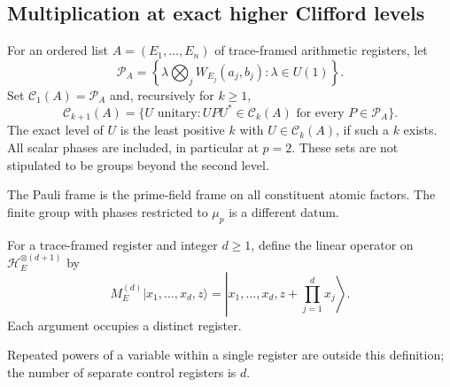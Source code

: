 \subsection{Multiplication at exact higher Clifford levels}

\begin{definition}
For an ordered list $A=(E_1,\ldots,E_n)$ of trace-framed arithmetic
registers, let
\[
 \mathcal P_A=
 \left\{\lambda\bigotimes_jW_{E_j}(a_j,b_j):\lambda\in U(1)\right\}.
\]
Set $\mathcal C_1(A)=\mathcal P_A$ and, recursively for $k\geq1$,
\[
 \mathcal C_{k+1}(A)=
 \{U\text{ unitary}:UPU^*\in\mathcal C_k(A)
                         \text{ for every }P\in\mathcal P_A\}.
\]
The exact level of $U$ is the least positive $k$ with
$U\in\mathcal C_k(A)$, if such a $k$ exists.  All scalar phases are
included, in particular at $p=2$.  These sets are not stipulated to be
groups beyond the second level.
\end{definition}
\begin{scope}
The Pauli frame is the prime-field frame on all constituent atomic factors.
The finite group with phases restricted to $\mu_p$ is a different datum.
\end{scope}

\begin{definition}
For a trace-framed register and integer $d\geq1$, define the linear
operator on $\mathcal H_E^{\otimes(d+1)}$ by
\[
 M_E^{(d)}|x_1,\ldots,x_d,z\rangle
 =\left|x_1,\ldots,x_d,z+\prod_{j=1}^dx_j\right\rangle.
\]
Each argument occupies a distinct register.
\end{definition}
\begin{scope}
Repeated powers of a variable within a single register are outside this
definition; the number of separate control registers is $d$.
\end{scope}

